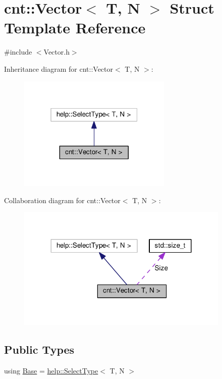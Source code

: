 \hypertarget{structcnt_1_1Vector}{}\section{cnt\+:\+:Vector$<$ T, N $>$ Struct Template Reference}
\label{structcnt_1_1Vector}


{\ttfamily \#include $<$Vector.\+h$>$}



Inheritance diagram for cnt\+:\+:Vector$<$ T, N $>$\+:\nopagebreak
\begin{figure}[H]
\begin{center}
\leavevmode
\includegraphics[width=208pt]{structcnt_1_1Vector__inherit__graph}
\end{center}
\end{figure}


Collaboration diagram for cnt\+:\+:Vector$<$ T, N $>$\+:\nopagebreak
\begin{figure}[H]
\begin{center}
\leavevmode
\includegraphics[width=288pt]{structcnt_1_1Vector__coll__graph}
\end{center}
\end{figure}
\subsection*{Public Types}
\begin{DoxyCompactItemize}
\item 
using \hyperlink{structcnt_1_1Vector_a576069efca0b0dd0de01315154bc92f4}{Base} = \hyperlink{namespacecnt_1_1help_aff828fb7490c72d9e29ff571ef973a5e}{help\+::\+Select\+Type}$<$ T, N $>$
\end{DoxyCompactItemize}
